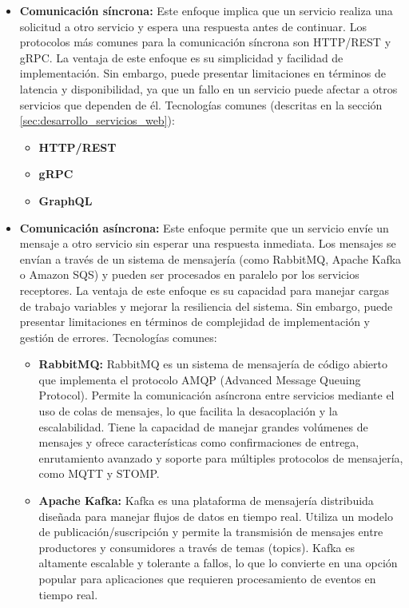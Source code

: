 \begin{itemize}
    \item \textbf{Comunicación síncrona:} Este enfoque implica que un servicio realiza una solicitud a otro servicio y espera una respuesta antes de continuar. Los protocolos más comunes para la comunicación síncrona son HTTP/REST y gRPC. La ventaja de este enfoque es su simplicidad y facilidad de implementación. Sin embargo, puede presentar limitaciones en términos de latencia y disponibilidad, ya que un fallo en un servicio puede afectar a otros servicios que dependen de él.
    Tecnologías comunes (descritas en la sección \ref{sec:desarrollo_servicios_web}):  
    \begin{itemize}
        \item \textbf{HTTP/REST}
        \item \textbf{gRPC} 
        \item \textbf{GraphQL}
    \end{itemize}
    \item \textbf{Comunicación asíncrona:} Este enfoque permite que un servicio envíe un mensaje a otro servicio sin esperar una respuesta inmediata. Los mensajes se envían a través de un sistema de mensajería (como RabbitMQ, Apache Kafka o Amazon SQS) y pueden ser procesados en paralelo por los servicios receptores. La ventaja de este enfoque es su capacidad para manejar cargas de trabajo variables y mejorar la resiliencia del sistema. Sin embargo, puede presentar limitaciones en términos de complejidad de implementación y gestión de errores.
    Tecnologías comunes:
    \begin{itemize}
        \item \textbf{RabbitMQ:} RabbitMQ es un sistema de mensajería de código abierto que implementa el protocolo AMQP (Advanced Message Queuing Protocol). Permite la comunicación asíncrona entre servicios mediante el uso de colas de mensajes, lo que facilita la desacoplación y la escalabilidad.
        Tiene la capacidad de manejar grandes volúmenes de mensajes y ofrece características como confirmaciones de entrega, enrutamiento avanzado y soporte para múltiples protocolos de mensajería, como MQTT y STOMP.
        \item \textbf{Apache Kafka:} Kafka es una plataforma de mensajería distribuida diseñada para manejar flujos de datos en tiempo real. Utiliza un modelo de publicación/suscripción y permite la transmisión de mensajes entre productores y consumidores a través de temas (topics). Kafka es altamente escalable y tolerante a fallos, lo que lo convierte en una opción popular para aplicaciones que requieren procesamiento de eventos en tiempo real.

\end{itemize}
\end{itemize}

